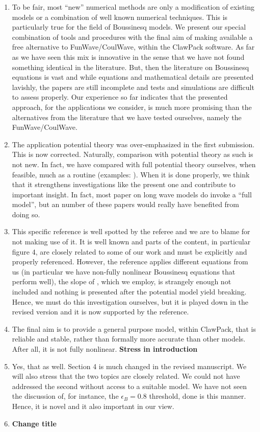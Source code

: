 \documentclass[11pt]{article}
\begin{document}
\begin{enumerate}
\item To be fair, most ``new'' numerical methods are only a modification of existing models or a combination
        of well known numerical techniques. This is particularly true for the field of Boussinesq models. 
      We present our special combination of tools and procedures with the final aim of making available a free 
      alternative to FunWave/CoulWave, within the ClawPack software. As far as we have seen this mix is innovative
      in the sense that we have not found something identical in the literature. But, then the literature on Boussinesq
      equations is vast and while equations and mathematical details are presented lavishly, the papers are
      still incomplete and tests and simulations are difficult to assess properly. Our experience so far indicates 
     that the  presented approach, for the applications we consider, is much more promising than the alternatives 
     from the literature that we have tested ourselves, namely the FunWave/CoulWave. 
\item The application potential theory was over-emphasized in the first submission.
      This is now corrected. Naturally, comparison with potential theory as such
      is not new. In fact,  we have compared with full potential theory ourselves, when feasible, 
      much as a routine (examples: \cite{Lovholt:2013a,Pedersen:2013}).
      When it is done properly,  we think that  it strengthens investigations like
      the present one and contribute to important insight. In fact,  most paper on long wave models do
      invoke a ``full model'', but an number of these papers would really have benefited from doing so.
\item This specific reference is well spotted by the referee and 
      we are to blame for not making use of it. It is well known and parts of the content, 
      in particular figure 4, are closely related to some of our work and must be explicitly and properly referenced.
       However, the reference applies different
      equations from us (in particular we have non-fully nonlinear Boussinesq equations that perform well), the slope
      of \cite{synolakis1987runup}, which we employ, is strangely enough not included and nothing is presented
      after the potential model yield breaking. Hence, we must do this investigation ourselves, but it is played down in the revised version and it is now supported by the reference.  
\item The final aim is to provide a general purpose model, within ClawPack, that is reliable and stable, rather than formally 
more accurate than other models. After all, it is not fully nonlinear.  {\bf Stress in introduction}
\item Yes, that as well. Section 4 is much changed in the revised manuscript. We will also stress that the two
      topics are closely related. We could not have addressed the second without access to a suitable model.
      We have not seen the discussion of, for instance, the $\epsilon_B=0.8$ threshold, done is this manner.
      Hence, it is novel and it also important in our view.      
\item {\bf Change title}
\end{enumerate}
\end{document}
